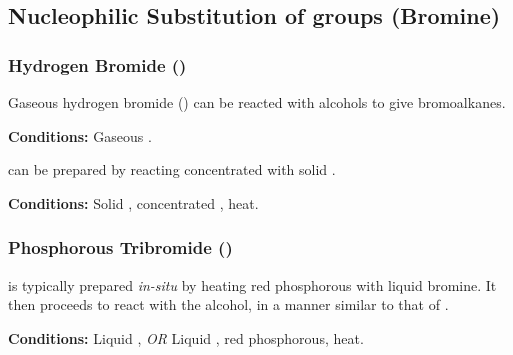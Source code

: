 		\pagebreak
		\subsection{Nucleophilic Substitution of  groups (Bromine)}

			\subsubsection{Hydrogen Bromide ()}

				Gaseous hydrogen bromide () can be reacted with alcohols to give bromoalkanes.

				\vspace{1.5em}
				\vbox{\textbf{Conditions:}	\tabto{35mm}Gaseous .}


				 can be prepared by reacting concentrated  with solid .

				\vspace{1.5em}
				\vbox{\textbf{Conditions:}	\tabto{35mm}Solid , concentrated , heat.}



			\subsubsection{Phosphorous Tribromide ()}

				 is typically prepared \textit{in-situ} by heating red phosphorous with liquid bromine. It then proceeds to
				react with the alcohol, in a manner similar to that of .

				\vspace{1.5em}
				\vbox{\textbf{Conditions:}	\tabto{35mm}Liquid , \textit{OR}
											\tabto{35mm}Liquid , {\color{Red}red} phosphorous, heat.}


